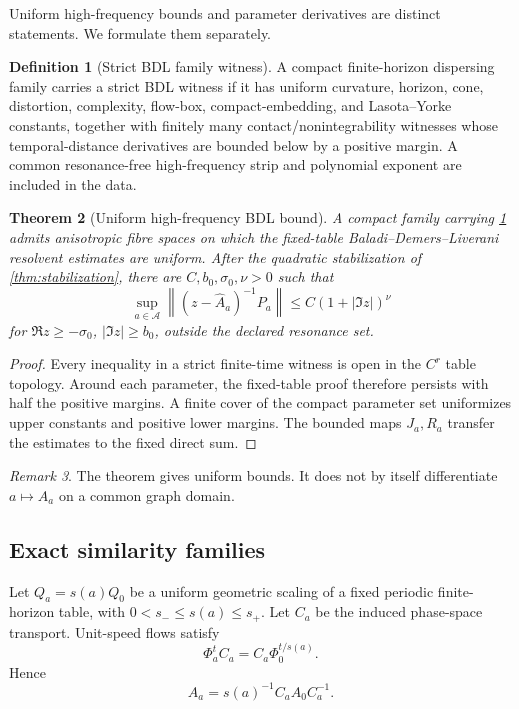 \documentclass[11pt,reqno]{amsart}
\newtheorem{theorem}{Theorem}[section]
\theoremstyle{definition}
\newtheorem{definition}[theorem]{Definition}
\theoremstyle{remark}
\newtheorem{remark}[theorem]{Remark}
\newcommand{\A}{\mathcal A}
\newcommand{\norm}[1]{\left\lVert #1\right\rVert}
\newcommand{\abs}[1]{\left\lvert #1\right\rvert}
\begin{document}
Uniform high-frequency bounds and parameter derivatives are distinct
statements.  We formulate them separately.

\begin{definition}[Strict BDL family witness]\label{def:bdl-witness}
A compact finite-horizon dispersing family carries a strict BDL witness if it
has uniform curvature, horizon, cone, distortion, complexity, flow-box,
compact-embedding, and Lasota--Yorke constants, together with finitely many
contact/nonintegrability witnesses whose temporal-distance derivatives are
bounded below by a positive margin.  A common resonance-free high-frequency
strip and polynomial exponent are included in the data.
\end{definition}

\begin{theorem}[Uniform high-frequency BDL bound]\label{thm:uniform-bdl}
A compact family carrying \cref{def:bdl-witness} admits anisotropic fibre
spaces on which the fixed-table Baladi--Demers--Liverani resolvent estimates are
uniform.  After the quadratic stabilization of \cref{thm:stabilization}, there
are $C,b_0,\sigma_0,\nu>0$ such that
\begin{equation}\label{eq:hf-bound}
 \sup_{a\in\A}
 \norm{(z-\widehat A_a)^{-1}P_a}
 \le C(1+\abs{\Im z})^\nu
\end{equation}
for $\Re z\ge-\sigma_0$, $\abs{\Im z}\ge b_0$, outside the declared resonance
set.
\end{theorem}

\begin{proof}
Every inequality in a strict finite-time witness is open in the $C^r$ table
topology.  Around each parameter, the fixed-table proof therefore persists
with half the positive margins.  A finite cover of the compact parameter set
uniformizes upper constants and positive lower margins.  The bounded maps
$J_a,R_a$ transfer the estimates to the fixed direct sum.
\end{proof}

\begin{remark}
The theorem gives uniform bounds.  It does not by itself differentiate
$a\mapsto A_a$ on a common graph domain.
\end{remark}

\subsection{Exact similarity families}
Let $Q_a=s(a)Q_0$ be a uniform geometric scaling of a fixed periodic
finite-horizon table, with $0<s_-\le s(a)\le s_+$.  Let $C_a$ be the induced
phase-space transport.  Unit-speed flows satisfy
\[
 \Phi_a^tC_a=C_a\Phi_0^{t/s(a)}.
\]
Hence
\begin{equation}\label{eq:generator-similarity}
 A_a=s(a)^{-1}C_aA_0C_a^{-1}.
\end{equation}
\end{document}
